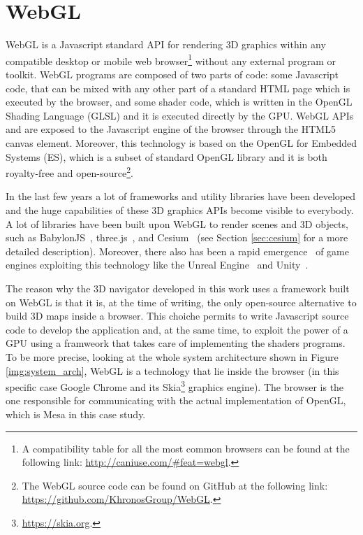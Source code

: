 \section{WebGL} \label{sec:webgl}
WebGL is a Javascript standard API for rendering 3D graphics within any compatible
desktop or mobile web browser\footnote{A compatibility table for all the most
common browsers can be found at the following link: \url{http://caniuse.com/#feat=webgl}.}
without any external program or toolkit. WebGL programs are composed of two parts
of code: some Javascript code, that can be mixed with any other part of a standard
HTML page which is executed by the browser, and some shader code, which is written 
in the OpenGL Shading Language (GLSL) and it is executed directly by the GPU.
WebGL APIs and are exposed to the Javascript engine of the browser through the
HTML5 canvas element. Moreover, this technology is based on the OpenGL for Embedded
Systems (ES),
which is a subset of standard OpenGL library and it is both
royalty-free and open-source\footnote{The WebGL source code can be found on GitHub
at the following link: \url{https://github.com/KhronosGroup/WebGL}.}.

In the last few years a lot of frameworks and utility libraries have been developed
and the huge capabilities of these 3D graphics APIs become visible to everybody.
A lot of libraries have been built upon WebGL to render scenes and 3D objects, such
as BabylonJS~\cite{babylon3d}, three.js~\cite{cabello2010three}, and 
Cesium~\cite{cozzi20113d} (see Section \ref{sec:cesium} for a more detailed description).
Moreover, there also has been a rapid emergence~\cite{parisi2014programming} of
game engines exploiting this technology like the Unreal Engine~\cite{games2007unreal}
and Unity~\cite{engine9unity}.

The reason why the 3D navigator developed in this work uses a framework built on
WebGL is that it is, at the time of writing, the only open-source alternative to
build 3D maps inside a browser. This choiche permits to write Javascript source
code to develop the application and, at the same time, to exploit the power of
a GPU using a framweork that takes care of implementing the shaders programs.
To be more precise, looking at the whole system architecture shown in Figure
\ref{img:system_arch}, WebGL is a technology that lie inside the browser
(in this specific case Google Chrome and its Skia\footnote{\url{https://skia.org}.}
graphics engine). The browser is the one responsible for communicating with
the actual implementation of OpenGL, which is Mesa in this case study.


